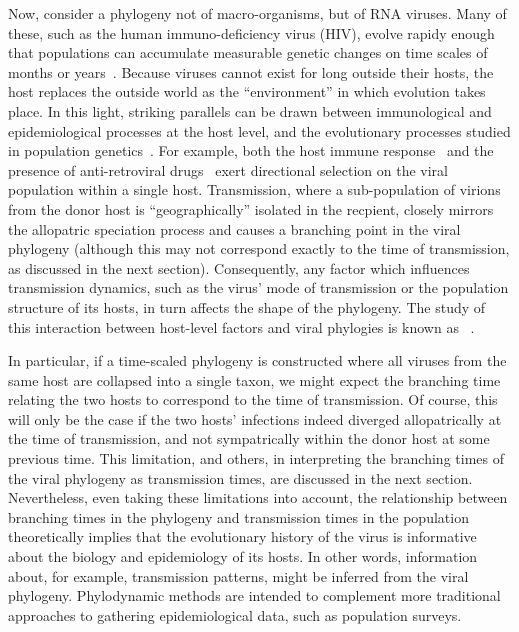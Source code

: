 Now, consider a phylogeny not of macro-organisms, but of RNA viruses. Many of
these, such as the human immuno-deficiency virus (HIV), evolve rapidy enough
that populations can accumulate measurable genetic changes on time scales of
months or years~\autocite{drummond2003measurably}. Because viruses cannot exist
for long outside their hosts, the host replaces the outside world as the
``environment'' in which evolution takes place. In this light, striking
parallels can be drawn between immunological and epidemiological processes at
the host level, and the evolutionary processes studied in population
genetics~\autocite{grenfell2004unifying}. For example, both the host immune
response~\autocite{??} and the presence of anti-retroviral drugs~\autocite{??}
exert directional selection on the viral population within a single host.
Transmission, where a sub-population of virions from the donor host is
``geographically'' isolated in the recpient, closely mirrors the allopatric
speciation process and causes a branching point in the viral phylogeny
(although this may not correspond exactly to the time of transmission, as
discussed in the next section). Consequently, any factor which influences
transmission dynamics, such as the virus' mode of transmission or the
population structure of its hosts, in turn affects the shape of the phylogeny.
The study of this interaction between host-level factors and viral phylogies is
known as ~\autocite{grenfell2004unifying}. 

In particular, if a time-scaled phylogeny is constructed where all viruses from
the same host are collapsed into a single taxon, we might expect the branching
time relating the two hosts to correspond to the time of transmission. Of
course, this will only be the case if the two hosts' infections indeed diverged
allopatrically at the time of transmission, and not sympatrically within the
donor host at some previous time. This limitation, and others, in interpreting
the branching times of the viral phylogeny as transmission times, are discussed
in the next section. Nevertheless, even taking these limitations into account,
the relationship between branching times in the phylogeny and transmission
times in the population theoretically implies that the evolutionary history of
the virus is informative about the biology and epidemiology of its hosts. In
other words, information about, for example, transmission patterns, might be
inferred from the viral phylogeny. Phylodynamic methods are intended to
complement more traditional approaches to gathering epidemiological data, such
as population surveys.

